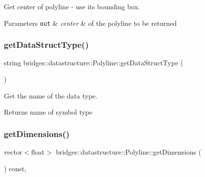 Get center of polyline -\/ use its bounding box. 


\begin{DoxyParams}[1]{Parameters}
\mbox{\tt out}  & {\em center} & of the polyline to be returned \\
\hline
\end{DoxyParams}
\mbox{\label{classbridges_1_1datastructure_1_1_polyline_a49b37ad55cf64fe759ee5a0f46e2e0cc}} 
\subsubsection{\texorpdfstring{get\+Data\+Struct\+Type()}{getDataStructType()}}
{\footnotesize\ttfamily string bridges\+::datastructure\+::\+Polyline\+::get\+Data\+Struct\+Type (\begin{DoxyParamCaption}{ }\end{DoxyParamCaption})\hspace{0.3cm}{\ttfamily [inline]}}



Get the name of the data type. 

\begin{DoxyReturn}{Returns}
name of symbol type 
\end{DoxyReturn}
\mbox{\label{classbridges_1_1datastructure_1_1_polyline_aefa5c986d003c9bde234e230a6bd8bd8}} 
\subsubsection{\texorpdfstring{get\+Dimensions()}{getDimensions()}}
{\footnotesize\ttfamily vector$<$float$>$ bridges\+::datastructure\+::\+Polyline\+::get\+Dimensions (\begin{DoxyParamCaption}{ }\end{DoxyParamCaption}) const\hspace{0.3cm}{\ttfamily [inline]}, {\ttfamily [virtual]}}




